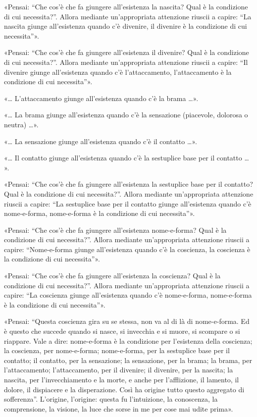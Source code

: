 «Pensai: “Che cos’è che fa giungere all’esistenza la nascita? Qual è la
condizione di cui necessita?”. Allora mediante un’appropriata attenzione
riuscii a capire: “La nascita giunge all’esistenza quando c’è divenire,
il divenire è la condizione di cui necessita”».


«Pensai: “Che cos’è che fa giungere all’esistenza il divenire? Qual è la
condizione di cui necessita?”. Allora mediante un’appropriata attenzione
riuscii a capire: “Il divenire giunge all’esistenza quando c’è
l’attaccamento, l’attaccamento è la condizione di cui necessita”».


«…​ L’attaccamento giunge all’esistenza quando c’è la brama …​».


«…​ La brama giunge all’esistenza quando c’è la sensazione (piacevole,
dolorosa o neutra) …​».


«…​ La sensazione giunge all’esistenza quando c’è il contatto …​».


«…​ Il contatto giunge all’esistenza quando c’è la sestuplice base per
il contatto …​».


«Pensai: “Che cos’è che fa giungere all’esistenza la sestuplice base per
il contatto? Qual è la condizione di cui necessita?”. Allora mediante
un’appropriata attenzione riuscii a capire: “La sestuplice base per il
contatto giunge all’esistenza quando c’è nome-e-forma, nome-e-forma è la
condizione di cui necessita”».


«Pensai: “Che cos’è che fa giungere all’esistenza nome-e-forma? Qual è
la condizione di cui necessita?”. Allora mediante un’appropriata
attenzione riuscii a capire: “Nome-e-forma giunge all’esistenza quando
c’è la coscienza, la coscienza è la condizione di cui necessita”».


«Pensai: “Che cos’è che fa giungere all’esistenza la coscienza? Qual è
la condizione di cui necessita?”. Allora mediante un’appropriata
attenzione riuscii a capire: “La coscienza giunge all’esistenza quando
c’è nome-e-forma, nome-e-forma è la condizione di cui necessita”».


«Pensai: “Questa coscienza gira su se stessa, non va al di là di
nome-e-forma. Ed è questo che succede quando si nasce, si invecchia e si
muore, si scompare o si riappare. Vale a dire: nome-e-forma è la
condizione per l’esistenza della coscienza; la coscienza, per
nome-e-forma; nome-e-forma, per la sestuplice base per il contatto; il
contatto, per la sensazione; la sensazione, per la brama; la brama, per
l’attaccamento; l’attaccamento, per il divenire; il divenire, per la
nascita; la nascita, per l’invecchiamento e la morte, e anche per
l’afflizione, il lamento, il dolore, il dispiacere e la disperazione.
Così ha origine tutto questo aggregato di sofferenza”. L’origine,
l’origine: questa fu l’intuizione, la conoscenza, la comprensione, la
visione, la luce che sorse in me per cose mai udite prima».


